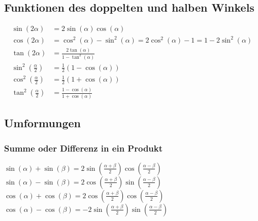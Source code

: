 	\vspace{10mm}
	\subsection*{Funktionen des doppelten und halben Winkels}			
			\begin{align*}
				\sin \left( 2 \alpha \right) &= 2 \sin \left( \alpha \right) \cos \left( \alpha \right) 
				\\
				\cos \left( 2 \alpha \right) &= \cos^2 \left( \alpha \right) - \sin^2 \left( \alpha \right) = 2 \cos^2 \left( \alpha \right) -1 = 1 - 2 \sin^2 \left( \alpha \right)
				\\
				\tan \left( 2 \alpha \right) &= \frac{2 \tan \left( \alpha \right)}{1 - \tan^2 \left( \alpha \right)}
				\\
				\sin^2 \left( \frac{\alpha}{2} \right) &= \frac{1}{2} \left( 1 - \cos \left( \alpha \right) \right)
				\\
				\cos^2 \left( \frac{\alpha}{2} \right) &= \frac{1}{2} \left( 1 + \cos \left( \alpha \right) \right)
				\\
				\tan^2 \left( \frac{\alpha}{2} \right) &= \frac{1 - \cos \left( \alpha \right)}{1 + \cos \left( \alpha \right)}
			\end{align*}
			
	\vspace{10mm}
	\subsection*{Umformungen}
	
	\vspace{10mm}
	\subsubsection*{Summe oder Differenz in ein Produkt}		
			\begin{flushleft}
				\(\sin \left( \alpha \right) + \sin \left( \beta \right) = 2 \sin \left( \frac{\alpha + \beta}{2}\right) \cos \left( \frac{\alpha - \beta}{2} \right)\)
				\\
				\(\sin \left( \alpha \right) - \sin \left( \beta \right) = 2 \cos \left( \frac{\alpha + \beta}{2}\right) \sin \left( \frac{\alpha - \beta}{2} \right)\)
				\\
				\(\cos \left( \alpha \right) + \cos \left( \beta \right) = 2 \cos \left( \frac{\alpha + \beta}{2}\right) \cos \left( \frac{\alpha - \beta}{2} \right)\)
				\\
				\(\cos \left( \alpha \right) - \cos \left( \beta \right) = -2 \sin \left( \frac{\alpha + \beta}{2}\right) \sin \left( \frac{\alpha - \beta}{2} \right)\)
			\end{flushleft}
	
